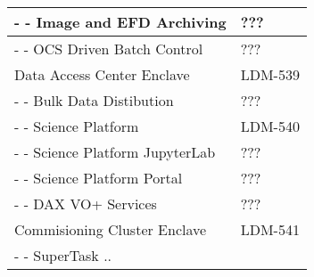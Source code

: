 \begin{longtable}{|p{}|p{}|}
- - Image and EFD Archiving &  ??? \\ \hline 
- - OCS Driven Batch Control &  ??? \\ \hline 
Data Access Center Enclave &  LDM-539 \\ \hline 
- - Bulk Data Distibution &  ??? \\ \hline 
- - Science Platform &  LDM-540 \\ \hline 
- - Science Platform JupyterLab &  ??? \\ \hline 
- - Science Platform Portal &  ??? \\ \hline 
- - DAX VO+ Services &  ??? \\ \hline 
Commisioning Cluster Enclave &  LDM-541 \\ \hline 
- - SuperTask .. &   \\ \hline 
\end{longtable} 
